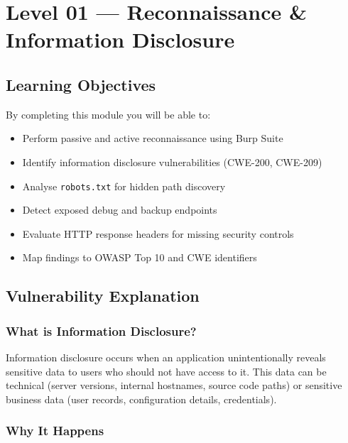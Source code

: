 \chapter{Level 01 — Reconnaissance \& Information Disclosure}
\label{ch:level01}

\section{Learning Objectives}

By completing this module you will be able to:
\begin{itemize}
  \item Perform passive and active reconnaissance using Burp Suite
  \item Identify information disclosure vulnerabilities (CWE-200, CWE-209)
  \item Analyse \texttt{robots.txt} for hidden path discovery
  \item Detect exposed debug and backup endpoints
  \item Evaluate HTTP response headers for missing security controls
  \item Map findings to OWASP Top 10 and CWE identifiers
\end{itemize}

\section{Vulnerability Explanation}

\subsection{What is Information Disclosure?}

Information disclosure occurs when an application unintentionally reveals sensitive data to users who should not have access to it. This data can be technical (server versions, internal hostnames, source code paths) or sensitive business data (user records, configuration details, credentials).

\subsection{Why It Happens}

